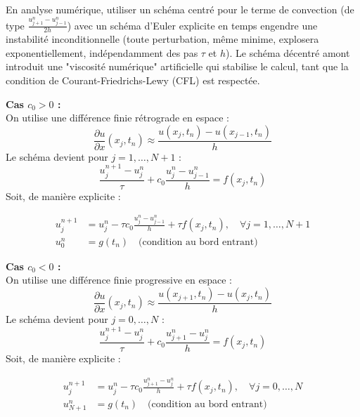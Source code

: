 \begin{explication}
En analyse numérique, utiliser un schéma centré pour le terme de convection (de type $\frac{u_{j+1}^n - u_{j-1}^n}{2h}$) avec un schéma d'Euler explicite en temps engendre une instabilité inconditionnelle (toute perturbation, même minime, explosera exponentiellement, indépendamment des pas $\tau$ et $h$). Le schéma décentré amont introduit une "viscosité numérique" artificielle qui stabilise le calcul, tant que la condition de Courant-Friedrichs-Lewy (CFL) est respectée.
\end{explication}

\textbf{Cas $c_0 > 0$ :} \\
On utilise une différence finie rétrograde en espace :
\begin{equation*}
\frac{\partial u}{\partial x}(x_j, t_n) \approx \frac{u(x_j, t_n) - u(x_{j-1}, t_n)}{h}
\end{equation*}
Le schéma devient pour $j=1, \dots, N+1$ :
\begin{equation*}
\frac{u_j^{n+1} - u_j^n}{\tau} + c_0 \frac{u_j^n - u_{j-1}^n}{h} = f(x_j, t_n)
\end{equation*}
Soit, de manière explicite :
\begin{algorithme}
\begin{align*}
u_j^{n+1} &= u_j^n - \tau c_0 \frac{u_j^n - u_{j-1}^n}{h} + \tau f(x_j, t_n), \quad \forall j=1, \dots, N+1 \\
u_0^n &= g(t_n) \quad \text{(condition au bord entrant)}
\end{align*}
\end{algorithme}

\textbf{Cas $c_0 < 0$ :} \\
On utilise une différence finie progressive en espace :
\begin{equation*}
\frac{\partial u}{\partial x}(x_j, t_n) \approx \frac{u(x_{j+1}, t_n) - u(x_j, t_n)}{h}
\end{equation*}
Le schéma devient pour $j=0, \dots, N$ :
\begin{equation*}
\frac{u_j^{n+1} - u_j^n}{\tau} + c_0 \frac{u_{j+1}^n - u_j^n}{h} = f(x_j, t_n)
\end{equation*}
Soit, de manière explicite :
\begin{algorithme}
\begin{align*}
u_j^{n+1} &= u_j^n - \tau c_0 \frac{u_{j+1}^n - u_j^n}{h} + \tau f(x_j, t_n), \quad \forall j=0, \dots, N \\
u_{N+1}^n &= g(t_n) \quad \text{(condition au bord entrant)}
\end{align*}
\end{algorithme}

